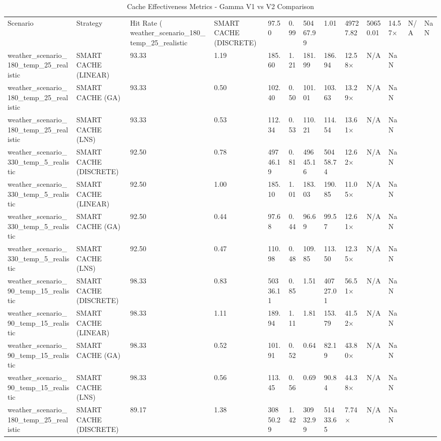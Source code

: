 \begin{table}
\caption{Cache Effectiveness Metrics - Gamma V1 vs V2 Comparison}
\label{tab:cache_metrics}
\begin{tabular}{lllllllllll}
\toprule
Scenario & Strategy & Hit Rate (%
\midrule
weather_scenario_180_temp_25_realistic & SMART CACHE (DISCRETE) & 97.50 & 0.99 & 50467.99 & 1.01 & 49727.82 & 50650.01 & 14.57× & N/A & NaN \\
weather_scenario_180_temp_25_realistic & SMART CACHE (LINEAR) & 93.33 & 1.19 & 185.60 & 1.21 & 181.99 & 186.94 & 12.58× & N/A & NaN \\
weather_scenario_180_temp_25_realistic & SMART CACHE (GA) & 93.33 & 0.50 & 102.40 & 0.50 & 101.01 & 103.63 & 13.29× & N/A & NaN \\
weather_scenario_180_temp_25_realistic & SMART CACHE (LNS) & 93.33 & 0.53 & 112.34 & 0.53 & 110.21 & 114.54 & 13.61× & N/A & NaN \\
weather_scenario_330_temp_5_realistic & SMART CACHE (DISCRETE) & 92.50 & 0.78 & 49746.19 & 0.81 & 49645.16 & 50458.74 & 12.62× & N/A & NaN \\
weather_scenario_330_temp_5_realistic & SMART CACHE (LINEAR) & 92.50 & 1.00 & 185.10 & 1.01 & 183.03 & 190.85 & 11.05× & N/A & NaN \\
weather_scenario_330_temp_5_realistic & SMART CACHE (GA) & 92.50 & 0.44 & 97.68 & 0.44 & 96.69 & 99.57 & 12.61× & N/A & NaN \\
weather_scenario_330_temp_5_realistic & SMART CACHE (LNS) & 92.50 & 0.47 & 110.98 & 0.48 & 109.85 & 113.50 & 12.35× & N/A & NaN \\
weather_scenario_90_temp_15_realistic & SMART CACHE (DISCRETE) & 98.33 & 0.83 & 50336.11 & 0.85 & 1.51 & 40727.01 & 56.51× & N/A & NaN \\
weather_scenario_90_temp_15_realistic & SMART CACHE (LINEAR) & 98.33 & 1.11 & 189.94 & 1.11 & 1.81 & 153.79 & 41.52× & N/A & NaN \\
weather_scenario_90_temp_15_realistic & SMART CACHE (GA) & 98.33 & 0.52 & 101.91 & 0.52 & 0.64 & 82.19 & 43.80× & N/A & NaN \\
weather_scenario_90_temp_15_realistic & SMART CACHE (LNS) & 98.33 & 0.56 & 113.45 & 0.56 & 0.69 & 90.84 & 44.38× & N/A & NaN \\
weather_scenario_180_temp_25_realistic & SMART CACHE (DISCRETE) & 89.17 & 1.38 & 30850.29 & 1.42 & 30932.99 & 51433.65 & 7.74× & N/A & NaN \\

\end{tabular}
\end{table}

